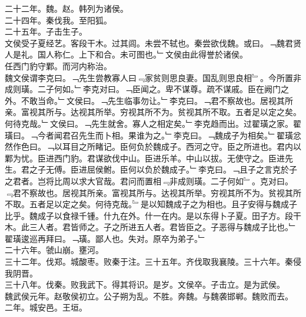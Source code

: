 \documentclass{zhvt-classic}
\begin{document}
\hspace*{2em}二十二年。魏。赵。韩列为诸侯。\\
\hspace*{2em}二十四年。秦伐我。至阳狐。\\
\hspace*{2em}二十五年。子击生子。\\
\hspace*{2em}文侯受子夏经艺。客段干木。过其闾。未尝不轼也。秦尝欲伐魏。或曰。﹁魏君贤人是礼。国人称仁。上下和合。未可图也。﹂文侯由此得誉於诸侯。\\
\hspace*{2em}任西门豹守鄴。而河内称治。\\
\hspace*{2em}魏文侯谓李克曰。﹁先生尝教寡人曰﹃家贫则思良妻。国乱则思良相﹄。今所置非成则璜。二子何如。﹂李克对曰。﹁臣闻之。卑不谋尊。疏不谋戚。臣在阙门之外。不敢当命。﹂文侯曰。﹁先生临事勿让。﹂李克曰。﹁君不察故也。居视其所亲。富视其所与。达视其所举。穷视其所不为。贫视其所不取。五者足以定之矣。何待克哉。﹂文侯曰。﹁先生就舍。寡人之相定矣。﹂李克趋而出。过翟璜之家。翟璜曰。﹁今者闻君召先生而卜相。果谁为之。﹂李克曰。﹁魏成子为相矣。﹂翟璜忿然作色曰。﹁以耳目之所睹记。臣何负於魏成子。西河之守。臣之所进也。君内以鄴为忧。臣进西门豹。君谋欲伐中山。臣进乐羊。中山以拔。无使守之。臣进先生。君之子无傅。臣进屈侯鲋。臣何以负於魏成子。﹂李克曰。﹁且子之言克於子之君者。岂将比周以求大官哉。君问而置相﹃非成则璜。二子何如﹄。克对曰。﹃君不察故也。居视其所亲。富视其所与。达视其所举。穷视其所不为。贫视其所不取。五者足以定之矣。何待克哉。﹄是以知魏成子之为相也。且子安得与魏成子比乎。魏成子以食禄千锺。什九在外。什一在内。是以东得卜子夏。田子方。段干木。此三人者。君皆师之。子之所进五人者。君皆臣之。子恶得与魏成子比也。﹂翟璜逡巡再拜曰。﹁璜。鄙人也。失对。原卒为弟子。﹂\\
\hspace*{2em}二十六年。虢山崩。壅河。\\
\hspace*{2em}三十二年。伐郑。城酸枣。败秦于注。三十五年。齐伐取我襄陵。三十六年。秦侵我阴晋。\\
\hspace*{2em}三十八年。伐秦。败我武下。得其将识。是岁。文侯卒。子击立。是为武侯。\\
\hspace*{2em}魏武侯元年。赵敬侯初立。公子朔为乱。不胜。奔魏。与魏袭邯郸。魏败而去。\\
\hspace*{2em}二年。城安邑。王垣。\\
\end{document}
